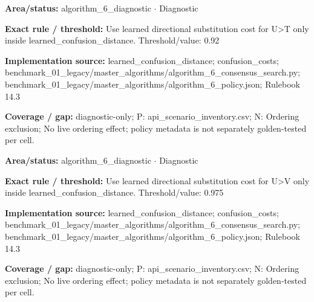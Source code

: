 \begin{tcolorbox}[enhanced,breakable,colback=white,colframe=Muted!45,boxrule=0.45pt,arc=1.5pt,left=6pt,right=6pt,top=5pt,bottom=5pt,title={\texttt{A6-LEARNED-SUBSTITUTION-U-T}},title after break={\texttt{A6-LEARNED-SUBSTITUTION-U-T}\ (continued)},fonttitle=\headingfont\bfseries\color{Navy},coltitle=Navy]
\textbf{Area/status:} algorithm\_\allowbreak{}6\_\allowbreak{}diagnostic $\boldsymbol{\cdot}$ Diagnostic\par
\smallskip
\textbf{Exact rule / threshold:} Use learned directional substitution cost for U>T only inside learned\_\allowbreak{}confusion\_\allowbreak{}distance. Threshold/\allowbreak{}value: 0.92\par
\smallskip
\textbf{Implementation source:} learned\_\allowbreak{}confusion\_\allowbreak{}distance; confusion\_\allowbreak{}costs; benchmark\_\allowbreak{}01\_\allowbreak{}legacy/\allowbreak{}master\_\allowbreak{}algorithms/\allowbreak{}algorithm\_\allowbreak{}6\_\allowbreak{}consensus\_\allowbreak{}search.py; benchmark\_\allowbreak{}01\_\allowbreak{}legacy/\allowbreak{}master\_\allowbreak{}algorithms/\allowbreak{}algorithm\_\allowbreak{}6\_\allowbreak{}policy.json; Rulebook 14.3\par
\smallskip
\textbf{Coverage / gap:} diagnostic-only; P: api\_\allowbreak{}scenario\_\allowbreak{}inventory.csv; N: Ordering exclusion; No live ordering effect; policy metadata is not separately golden-tested per cell.
\end{tcolorbox}
\begin{tcolorbox}[enhanced,breakable,colback=white,colframe=Muted!45,boxrule=0.45pt,arc=1.5pt,left=6pt,right=6pt,top=5pt,bottom=5pt,title={\texttt{A6-LEARNED-SUBSTITUTION-U-V}},title after break={\texttt{A6-LEARNED-SUBSTITUTION-U-V}\ (continued)},fonttitle=\headingfont\bfseries\color{Navy},coltitle=Navy]
\textbf{Area/status:} algorithm\_\allowbreak{}6\_\allowbreak{}diagnostic $\boldsymbol{\cdot}$ Diagnostic\par
\smallskip
\textbf{Exact rule / threshold:} Use learned directional substitution cost for U>V only inside learned\_\allowbreak{}confusion\_\allowbreak{}distance. Threshold/\allowbreak{}value: 0.975\par
\smallskip
\textbf{Implementation source:} learned\_\allowbreak{}confusion\_\allowbreak{}distance; confusion\_\allowbreak{}costs; benchmark\_\allowbreak{}01\_\allowbreak{}legacy/\allowbreak{}master\_\allowbreak{}algorithms/\allowbreak{}algorithm\_\allowbreak{}6\_\allowbreak{}consensus\_\allowbreak{}search.py; benchmark\_\allowbreak{}01\_\allowbreak{}legacy/\allowbreak{}master\_\allowbreak{}algorithms/\allowbreak{}algorithm\_\allowbreak{}6\_\allowbreak{}policy.json; Rulebook 14.3\par
\smallskip
\textbf{Coverage / gap:} diagnostic-only; P: api\_\allowbreak{}scenario\_\allowbreak{}inventory.csv; N: Ordering exclusion; No live ordering effect; policy metadata is not separately golden-tested per cell.
\end{tcolorbox}
